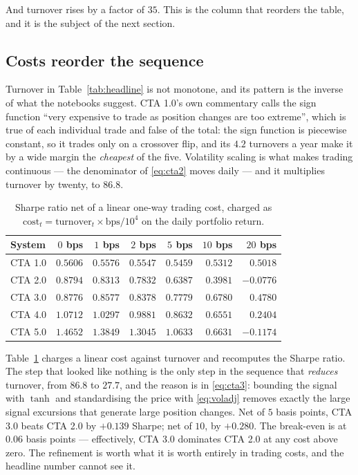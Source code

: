 \documentclass[11pt,a4paper]{article}
\begin{document}
And turnover rises by a factor of $35$. This is the column that reorders the
table, and it is the subject of the next section.

\subsection{Costs reorder the sequence}

Turnover in Table~\ref{tab:headline} is not monotone, and its pattern is the
inverse of what the notebooks suggest. CTA 1.0's own commentary calls the sign
function ``very expensive to trade as position changes are too extreme'',
which is true of each individual trade and false of the total: the sign
function is piecewise constant, so it trades only on a crossover flip, and its
$4.2$ turnovers a year make it by a wide margin the \emph{cheapest} of the
five. Volatility scaling is what makes trading continuous --- the denominator
of \eqref{eq:cta2} moves daily --- and it multiplies turnover by twenty, to
$86.8$.

\begin{table}[t]
\centering
\caption{Sharpe ratio net of a linear one-way trading cost, charged as
$\text{cost}_t = \text{turnover}_t \times \text{bps}/10^4$ on the daily
portfolio return.}
\label{tab:cost}
\begin{tabular}{lrrrrrr}
\toprule
System & $0$ bps & $1$ bps & $2$ bps & $5$ bps & $10$ bps & $20$ bps \\
\midrule
CTA 1.0 & $0.5606$ & $0.5576$ & $0.5547$ & $0.5459$ & $0.5312$ & $0.5018$ \\
CTA 2.0 & $0.8794$ & $0.8313$ & $0.7832$ & $0.6387$ & $0.3981$ & $-0.0776$ \\
CTA 3.0 & $0.8776$ & $0.8577$ & $0.8378$ & $0.7779$ & $0.6780$ & $0.4780$ \\
CTA 4.0 & $1.0712$ & $1.0297$ & $0.9881$ & $0.8632$ & $0.6551$ & $0.2404$ \\
CTA 5.0 & $1.4652$ & $1.3849$ & $1.3045$ & $1.0633$ & $0.6631$ & $-0.1174$ \\
\bottomrule
\end{tabular}
\end{table}

Table~\ref{tab:cost} charges a linear cost against turnover and recomputes the
Sharpe ratio. The step that looked like nothing is the only step in the
sequence that \emph{reduces} turnover, from $86.8$ to $27.7$, and the reason
is in \eqref{eq:cta3}: bounding the signal with $\tanh$ and standardising the
price with \eqref{eq:voladj} removes exactly the large signal excursions that
generate large position changes. Net of $5$ basis points, CTA 3.0 beats
CTA 2.0 by $+0.139$ Sharpe; net of $10$, by $+0.280$. The break-even is at
$0.06$ basis points --- effectively, CTA 3.0 dominates CTA 2.0 at any cost
above zero. The refinement is worth what it is worth entirely in trading
costs, and the headline number cannot see it.
\end{document}
